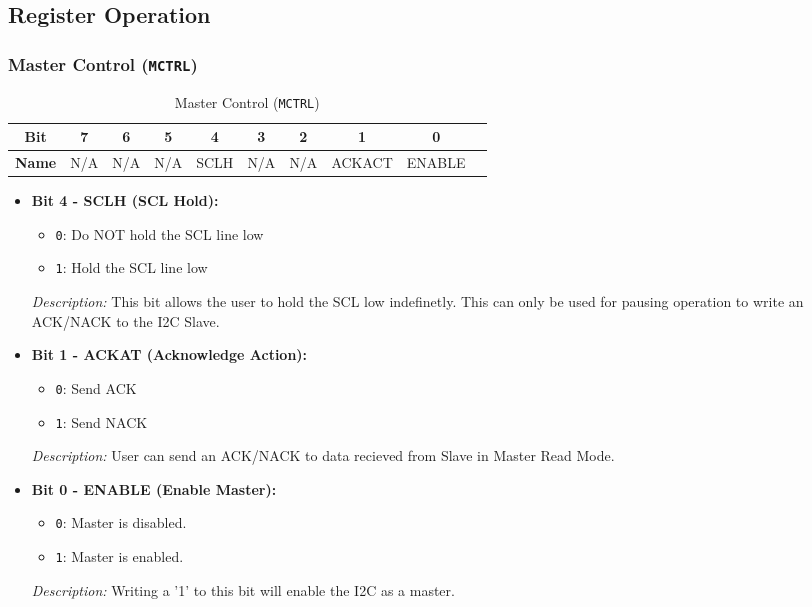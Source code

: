   \newpage

  \subsection{Register Operation}

  \subsubsection{Master Control (\texttt{MCTRL})}
  \label{sec:mctrl}
  
  \begin{table}[H]
      \centering
      \caption{Master Control (\texttt{MCTRL})}
      \begin{tabular}{@{}cccccccccc@{}}
          \toprule
          \textbf{Bit} & 7 & 6 & 5 & 4 & 3 & 2 & 1 & 0 \\ \midrule
          \textbf{Name} & N/A & N/A & N/A & SCLH & N/A & N/A & ACKACT & ENABLE \\ \bottomrule
      \end{tabular}
      \label{tab:mctrl}
  \end{table}
  
  \begin{itemize}
      \item \textbf{Bit 4 - SCLH (SCL Hold):} 
      \begin{itemize}
          \item \texttt{0}: Do NOT hold the SCL line low
          \item \texttt{1}: Hold the SCL line low
      \end{itemize}
      \textit{Description:} This bit allows the user to hold the SCL low indefinetly. This can only be used for pausing operation to write an ACK/NACK to the I2C Slave.
      
      \item \textbf{Bit 1 - ACKAT (Acknowledge Action):} 
      \begin{itemize}
          \item \texttt{0}: Send ACK
          \item \texttt{1}: Send NACK
      \end{itemize}
      \textit{Description:} User can send an ACK/NACK to data recieved from Slave in Master Read Mode.
      
      \item \textbf{Bit 0 - ENABLE (Enable Master):} 
      \begin{itemize}
          \item \texttt{0}: Master is disabled.
          \item \texttt{1}: Master is enabled.
      \end{itemize}
      \textit{Description:} Writing a '1' to this bit will enable the I2C as a master.
  \end{itemize}
  
